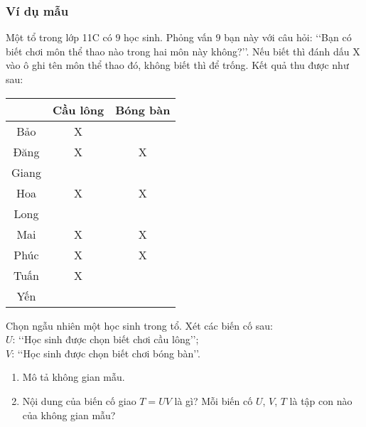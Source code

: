 \subsubsection{Ví dụ mẫu}
\begin{vd}%
	Một tổ trong lớp 11C có $9$ học sinh. Phỏng vấn $9$ bạn này với câu hỏi: \lq\lq Bạn có biết chơi môn thể thao nào trong hai môn này không?\rq\rq. Nếu biết thì đánh dấu X vào ô ghi tên môn thể thao đó, không biết thì để trống. Kết quả thu được như sau:
	\begin{center}
		\begin{tabular}{|c|c|c|}
			\hline
			\diagbox{Tên học sinh}{Môn thể thao} & Cầu lông & Bóng bàn \\
			\hline
			Bảo & X & \\
			\hline
			Đăng & X & X \\
			\hline
			Giang & & \\
			\hline
			Hoa & X & X \\
			\hline
			Long & & \\
			\hline
			Mai & X & X \\
			\hline
			Phúc & X & X \\
			\hline
			Tuấn & X & \\
			\hline
			Yến & & \\
			\hline
		\end{tabular}
	\end{center}
	Chọn ngẫu nhiên một học sinh trong tổ. Xét các biến cố sau:\\	
	$U$: \lq\lq Học sinh được chọn biết chơi cầu lông\rq\rq;\\
	$V$: \lq\lq Học sinh được chọn biết chơi bóng bàn\rq\rq.
	\begin{enumerate}
		\item Mô tả không gian mẫu.
		\item Nội dung của biến cố giao $T=U V$ là gì? Mỗi biến cố $U$, $V$, $T$ là tập con nào của không gian mẫu?
	\end{enumerate}
\end{vd}
